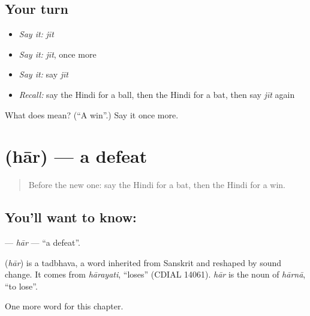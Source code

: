 \subsection*{Your turn}
\begin{itemize}
\raggedright
  \item \emph{Say it:} \emph{jīt}
  \item \emph{Say it:} \emph{jīt}, once more
  \item \emph{Say it:} say \emph{jīt}
  \item \emph{Recall:} say the Hindi for a ball, then the Hindi for a bat, then say \emph{jīt} again
\end{itemize}

\begin{tcolorbox}[breakable,colback=teal!4,colframe=teal!35!black,title={Before you move on}]
What does  mean? (\textquotedblleft{}A win\textquotedblright{}.) Say it once more.
\end{tcolorbox}
\section[\texorpdfstring{\hi{हार} (hār)}{हार (hār)}]{ (hār) — a defeat}

\label{lesson:HI-C224-har}



\begin{quote}
Before the new one: say the Hindi for a bat, then the Hindi for a win.
\end{quote}

\subsection*{You'll want to know: }
\textbf{} — \emph{hār} — \textquotedblleft{}a defeat\textquotedblright{}.

\begin{cousinweb}
\textbf{} (\emph{hār}) is a tadbhava, a word inherited from Sanskrit and reshaped by sound change. It comes from \emph{hārayati}, \textquotedblleft{}loses\textquotedblright{} (CDIAL 14061). \emph{hār} is the noun of \emph{hārnā}, \textquotedblleft{}to lose\textquotedblright{}.
\end{cousinweb}

\begin{grammarlens}[title={What you've built}]
One more word for this chapter.
\end{grammarlens}

